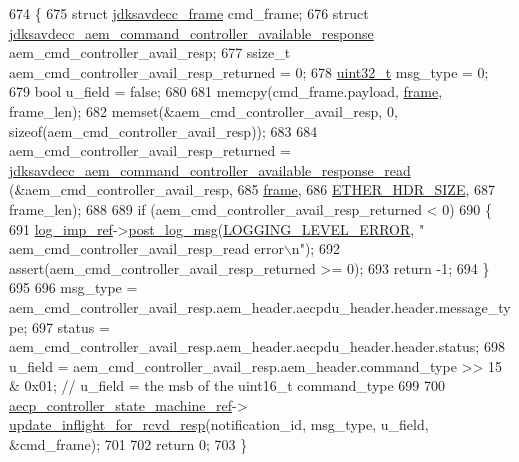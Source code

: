 \begin{DoxyCode}
674 \{
675     \textcolor{keyword}{struct }\hyperlink{structjdksavdecc__frame}{jdksavdecc\_frame} cmd\_frame;
676     \textcolor{keyword}{struct }\hyperlink{structjdksavdecc__aem__command__controller__available__response}{jdksavdecc\_aem\_command\_controller\_available\_response}
       aem\_cmd\_controller\_avail\_resp;
677     ssize\_t aem\_cmd\_controller\_avail\_resp\_returned = 0;
678     \hyperlink{parse_8c_a6eb1e68cc391dd753bc8ce896dbb8315}{uint32\_t} msg\_type = 0;
679     \textcolor{keywordtype}{bool} u\_field = \textcolor{keyword}{false};
680 
681     memcpy(cmd\_frame.payload, \hyperlink{gst__avb__playbin_8c_ac8e710e0b5e994c0545d75d69868c6f0}{frame}, frame\_len);
682     memset(&aem\_cmd\_controller\_avail\_resp, 0, \textcolor{keyword}{sizeof}(aem\_cmd\_controller\_avail\_resp));
683 
684     aem\_cmd\_controller\_avail\_resp\_returned = 
      \hyperlink{group__command__controller__available__response_gafb1b0dede49f19f13ef16c8308cfc5f6}{jdksavdecc\_aem\_command\_controller\_available\_response\_read}
      (&aem\_cmd\_controller\_avail\_resp,
685                                                                                                        
      \hyperlink{gst__avb__playbin_8c_ac8e710e0b5e994c0545d75d69868c6f0}{frame},
686                                                                                                        
      \hyperlink{namespaceavdecc__lib_a6c827b1a0d973e18119c5e3da518e65ca9512ad9b34302ba7048d88197e0a2dc0}{ETHER\_HDR\_SIZE},
687                                                                                                        
      frame\_len);
688 
689     \textcolor{keywordflow}{if} (aem\_cmd\_controller\_avail\_resp\_returned < 0)
690     \{
691         \hyperlink{namespaceavdecc__lib_acbe3e2a96ae6524943ca532c87a28529}{log\_imp\_ref}->\hyperlink{classavdecc__lib_1_1log_a68139a6297697e4ccebf36ccfd02e44a}{post\_log\_msg}(\hyperlink{namespaceavdecc__lib_a501055c431e6872ef46f252ad13f85cdaf2c4481208273451a6f5c7bb9770ec8a}{LOGGING\_LEVEL\_ERROR}, \textcolor{stringliteral}{"
      aem\_cmd\_controller\_avail\_resp\_read error\(\backslash\)n"});
692         assert(aem\_cmd\_controller\_avail\_resp\_returned >= 0);
693         \textcolor{keywordflow}{return} -1;
694     \}
695 
696     msg\_type = aem\_cmd\_controller\_avail\_resp.aem\_header.aecpdu\_header.header.message\_type;
697     status = aem\_cmd\_controller\_avail\_resp.aem\_header.aecpdu\_header.header.status;
698     u\_field = aem\_cmd\_controller\_avail\_resp.aem\_header.command\_type >> 15 & 0x01; \textcolor{comment}{// u\_field = the msb of
       the uint16\_t command\_type}
699 
700     \hyperlink{namespaceavdecc__lib_a0b1b5aea3c0490f77cbfd9178af5be22}{aecp\_controller\_state\_machine\_ref}->
      \hyperlink{classavdecc__lib_1_1aecp__controller__state__machine_a997abd9786c330a5505e903e6443208e}{update\_inflight\_for\_rcvd\_resp}(notification\_id, msg\_type, u\_field, &cmd\_frame);
701 
702     \textcolor{keywordflow}{return} 0;
703 \}
\end{DoxyCode}


